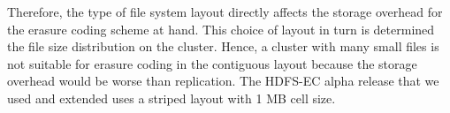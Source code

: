 \documentclass{sig-alternate-05-2015}
\begin{document}
Therefore, the type of file system layout directly affects the storage overhead for the erasure coding scheme at hand. This choice of layout in turn is determined the file size distribution on the cluster. Hence, a cluster with many small files is not suitable for erasure coding in the contiguous layout because the storage overhead would be worse than replication. The HDFS-EC alpha release that we used and extended uses a striped layout with 1 MB cell size. 



%
%
%
\end{document}
